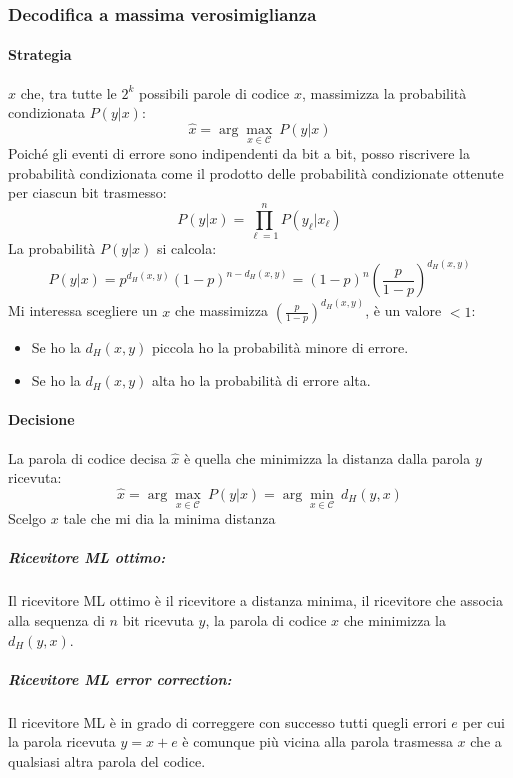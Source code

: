         \subsubsection{Decodifica a massima verosimiglianza}
            \paragraph{Strategia}
                $\hat{x}$ che, tra tutte le $2^k$ possibili parole di codice $x$, massimizza la probabilità condizionata 
                $P(y|x)$:
                \[
                    \hat{x} = \arg \underset{x\in\mathcal{C}}{\max}\ P(y|x)
                \]
                Poiché gli eventi di errore sono indipendenti da bit a bit, posso riscrivere la probabilità condizionata come il prodotto delle probabilità condizionate
                ottenute per ciascun bit trasmesso:
                \[
                    P(y|x) = \prod_{\ell=1}^{n} P(y_\ell|x_\ell)
                \]
                La probabilità $P(y|x)$ si calcola:
                \[
                    P(y|x) = p^{d_H(x,y)}(1-p)^{n-d_H(x,y)} =(1-p)^{n}\left(\frac{p}{1-p}\right)^{d_H(x,y)} 
                \]
                Mi interessa scegliere un $x$ che massimizza $\left(\frac{p}{1-p}\right)^{d_H(x,y)}$, è un valore $<1$:
                \begin{itemize}
                    \item {
                        Se ho la $d_H(x,y)$ piccola ho la probabilità minore di errore.
                    }
                    \item {
                        Se ho la $d_H(x,y)$ alta ho la probabilità di errore alta.
                    }
                \end{itemize}
            \paragraph{Decisione}
                La parola di codice decisa $\hat{x}$ è quella che minimizza la distanza dalla parola $y$ ricevuta:
                \[
                    \hat{x} = \arg \underset{x\in\mathcal{C}}{\max}\ P(y|x) = \arg \underset{x\in\mathcal{C}}{\min}\ d_H(y,x)
                \]
                Scelgo $x$ tale che mi dia la minima distanza
                \subparagraph{Ricevitore ML ottimo:} Il ricevitore ML ottimo è il ricevitore a distanza minima, il ricevitore
                che associa alla sequenza di $n$ bit ricevuta $y$, la parola di codice $x$ che minimizza la $d_H(y,x)$.
                \subparagraph{Ricevitore ML error correction:} Il ricevitore ML è in grado di correggere con successo tutti quegli errori
                $e$ per cui la parola ricevuta $y = x+e$ è comunque più vicina alla parola trasmessa $x$ che a qualsiasi altra parola del codice.
                

